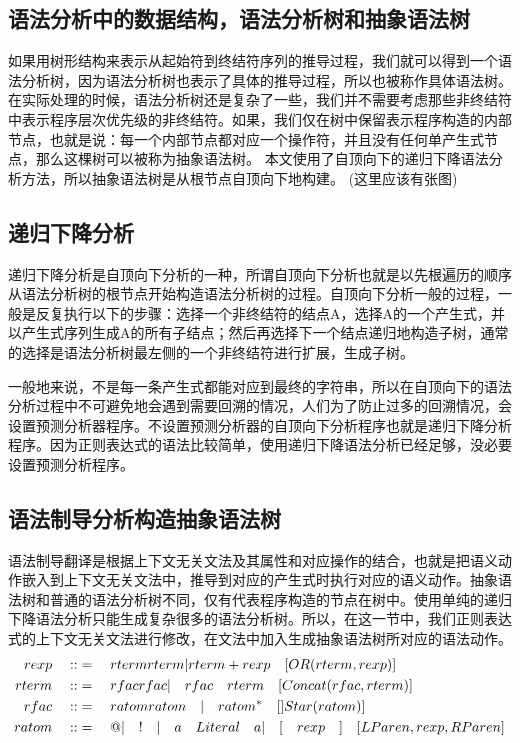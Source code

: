 \documentclass[openany,oneside]{book}
\theoremstyle{definition}
\theoremstyle{definition}
\begin{document}
	\subsection{语法分析中的数据结构，语法分析树和抽象语法树}
	如果用树形结构来表示从起始符到终结符序列的推导过程，我们就可以得到一个语法分析树，因为语法分析树也表示了具体的推导过程，所以也被称作具体语法树。在实际处理的时候，语法分析树还是复杂了一些，我们并不需要考虑那些非终结符中表示程序层次优先级的非终结符。如果，我们仅在树中保留表示程序构造的内部节点，也就是说：每一个内部节点都对应一个操作符，并且没有任何单产生式节点，那么这棵树可以被称为抽象语法树。\cite{2002编译原理}
	本文使用了自顶向下的递归下降语法分析方法，所以抽象语法树是从根节点自顶向下地构建。
	(这里应该有张图)
	\subsection{递归下降分析}
	递归下降分析是自顶向下分析的一种，所谓自顶向下分析也就是以先根遍历的顺序从语法分析树的根节点开始构造语法分析树的过程。自顶向下分析一般的过程，一般是反复执行以下的步骤：选择一个非终结符的结点A，选择A的一个产生式，并以产生式序列生成A的所有子结点；然后再选择下一个结点递归地构造子树，通常的选择是语法分析树最左侧的一个非终结符进行扩展，生成子树。
	
	一般地来说，不是每一条产生式都能对应到最终的字符串，所以在自顶向下的语法分析过程中不可避免地会遇到需要回溯的情况，人们为了防止过多的回溯情况，会设置预测分析器程序。不设置预测分析器的自顶向下分析程序也就是递归下降分析程序。因为正则表达式的语法比较简单，使用递归下降语法分析已经足够，没必要设置预测分析程序。
	
	\subsection{语法制导分析构造抽象语法树}
	语法制导翻译是根据上下文无关文法及其属性和对应操作的结合，也就是把语义动作嵌入到上下文无关文法中，推导到对应的产生式时执行对应的语义动作。抽象语法树和普通的语法分析树不同，仅有代表程序构造的节点在树中。使用单纯的递归下降语法分析只能生成复杂很多的语法分析树。所以，在这一节中，我们正则表达式的上下文无关文法进行修改，在文法中加入生成抽象语法树所对应的语法动作。
		\begin{equation}\label{cfg}
		\begin{split}
			rexp \quad::&=\quad rterm{rterm} | rterm + rexp \quad [OR( rterm, rexp)]\hfill  \\
			rterm\quad::&=\quad rfac {rfac}| \quad rfac\quad rterm \quad [Concat(rfac,rterm)]\hfill  \\
			rfac\quad::&=\quad ratom {ratom}\quad | \quad ratom^* \quad []Star(ratom)]\hfill \\
			ratom\quad::&=\quad @ | \quad ! \quad |\quad a \quad {Literal\quad a} | \quad[\quad rexp \quad]\quad  [LParen ,rexp, RParen]\hfill 
		\end{split}
	\end{equation}
\end{document}
